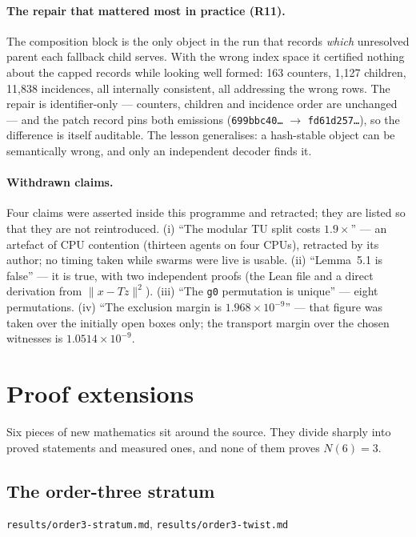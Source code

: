 \documentclass[10pt]{article}
\theoremstyle{definition}
\newcommand{\norm}[1]{\lVert #1\rVert}
\newcommand{\file}[1]{\texttt{\small #1}}
\begin{document}
\paragraph{The repair that mattered most in practice (R11).} The composition block is the only object
in the run that records \emph{which} unresolved parent each fallback child serves. With the wrong index
space it certified nothing about the capped records while looking well formed: 163 counters, 1,127
children, 11,838 incidences, all internally consistent, all addressing the wrong rows. The repair is
identifier-only --- counters, children and incidence order are unchanged --- and the patch record pins
both emissions (\texttt{699bbc40\ldots} $\to$ \texttt{fd61d257\ldots}), so the difference is itself
auditable. The lesson generalises: a hash-stable object can be semantically wrong, and only an
independent decoder finds it.

\paragraph{Withdrawn claims.} Four claims were asserted inside this programme and retracted; they are
listed so that they are not reintroduced. (i) ``The modular TU split costs $1.9\times$'' --- an artefact
of CPU contention (thirteen agents on four CPUs), retracted by its author; no timing taken while
swarms were live is usable. (ii) ``Lemma~5.1 is false'' --- it is true, with two independent proofs
(the Lean file and a direct derivation from $\norm{x-Tz}^2$). (iii) ``The \texttt{g0} permutation is
unique'' --- eight permutations. (iv) ``The exclusion margin is $1.968\times10^{-9}$'' --- that figure
was taken over the initially open boxes only; the transport margin over the chosen witnesses is
$1.0514\times10^{-9}$.

\section{Proof extensions}

Six pieces of new mathematics sit around the source. They divide sharply into proved statements and
measured ones, and none of them proves $N(6)=3$.

\subsection{The order-three stratum}
\file{results/\allowbreak{}order3-\allowbreak{}stratum.md}, \file{results/\allowbreak{}order3-\allowbreak{}twist.md}
\end{document}
